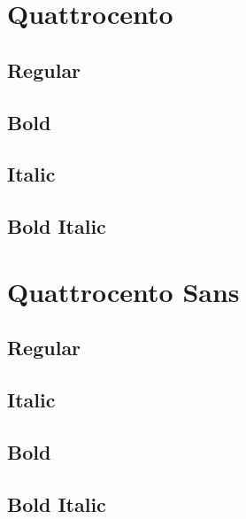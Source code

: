 \documentclass{article}
\begin{document}
\section{Quattrocento}
\subsection*{Regular}
\lipsum[1]

\subsection*{Bold}
\textbf{\lipsum[2]}


\subsection*{Italic}
\textit{\lipsum[3]}

\subsection*{Bold Italic}
\textbf{\textit{\lipsum[4]}}


\section{Quattrocento Sans}\sf

\subsection*{Regular}
\lipsum[1]

\subsection*{Italic}
\textit{\lipsum[2]}

\subsection*{Bold}
\textbf{\lipsum[3]}

\subsection*{Bold Italic}

\textbf{\textit{\lipsum[4]}}
\end{document}
